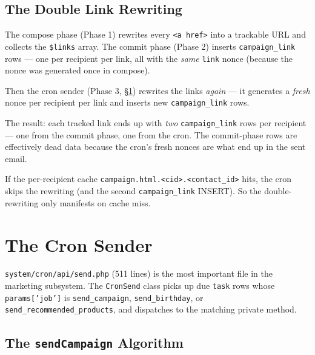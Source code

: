 \documentclass[11pt,a4paper]{article}
\begin{document}
\subsection{The Double Link Rewriting}

\begin{findingbox}
The compose phase (Phase 1) rewrites every \texttt{<a href>} into
a trackable URL and collects the \texttt{\$links} array. The
commit phase (Phase 2) inserts \texttt{campaign\_link} rows ---
one per recipient per link, all with the \emph{same} \texttt{link}
nonce (because the nonce was generated once in compose).

Then the cron sender (Phase 3, \S\ref{sec:cron}) rewrites the
links \emph{again} --- it generates a \emph{fresh} nonce per
recipient per link and inserts new \texttt{campaign\_link} rows.

The result: each tracked link ends up with \emph{two}
\texttt{campaign\_link} rows per recipient --- one from the commit
phase, one from the cron. The commit-phase rows are effectively
dead data because the cron's fresh nonces are what end up in the
sent email.

If the per-recipient cache \texttt{campaign.html.<cid>.<contact\_id>}
hits, the cron skips the rewriting (and the second
\texttt{campaign\_link} INSERT). So the double-rewriting only
manifests on cache miss.
\end{findingbox}

\section{The Cron Sender}\label{sec:cron}

\texttt{system/cron/api/send.php} (511 lines) is the most
important file in the marketing subsystem. The \texttt{CronSend}
class picks up due \texttt{task} rows whose
\texttt{params['job']} is \texttt{send\_campaign},
\texttt{send\_birthday}, or \texttt{send\_recommended\_products},
and dispatches to the matching private method.

\subsection{The \texttt{sendCampaign} Algorithm}
\end{document}
